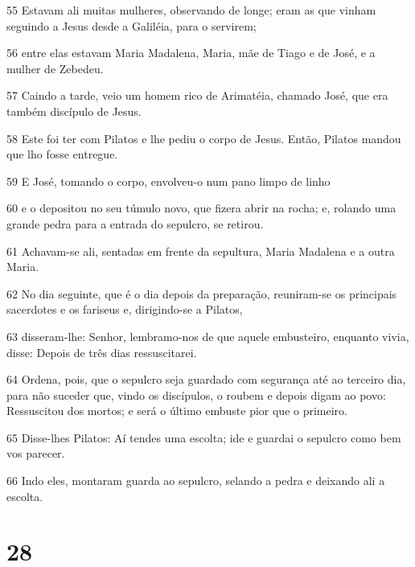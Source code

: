 \par 55 Estavam ali muitas mulheres, observando de longe; eram as que vinham seguindo a Jesus desde a Galiléia, para o servirem;
\par 56 entre elas estavam Maria Madalena, Maria, mãe de Tiago e de José, e a mulher de Zebedeu.
\par 57 Caindo a tarde, veio um homem rico de Arimatéia, chamado José, que era também discípulo de Jesus.
\par 58 Este foi ter com Pilatos e lhe pediu o corpo de Jesus. Então, Pilatos mandou que lho fosse entregue.
\par 59 E José, tomando o corpo, envolveu-o num pano limpo de linho
\par 60 e o depositou no seu túmulo novo, que fizera abrir na rocha; e, rolando uma grande pedra para a entrada do sepulcro, se retirou.
\par 61 Achavam-se ali, sentadas em frente da sepultura, Maria Madalena e a outra Maria.
\par 62 No dia seguinte, que é o dia depois da preparação, reuniram-se os principais sacerdotes e os fariseus e, dirigindo-se a Pilatos,
\par 63 disseram-lhe: Senhor, lembramo-nos de que aquele embusteiro, enquanto vivia, disse: Depois de três dias ressuscitarei.
\par 64 Ordena, pois, que o sepulcro seja guardado com segurança até ao terceiro dia, para não suceder que, vindo os discípulos, o roubem e depois digam ao povo: Ressuscitou dos mortos; e será o último embuste pior que o primeiro.
\par 65 Disse-lhes Pilatos: Aí tendes uma escolta; ide e guardai o sepulcro como bem vos parecer.
\par 66 Indo eles, montaram guarda ao sepulcro, selando a pedra e deixando ali a escolta.

\chapter{28}

